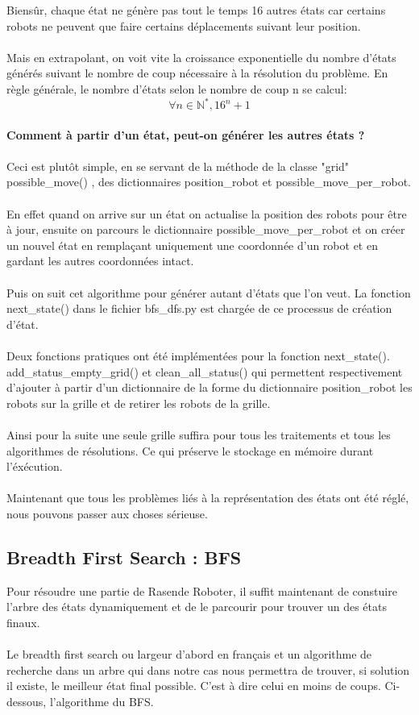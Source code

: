 \documentclass{article}
\begin{document}
Biensûr, chaque état ne génère pas tout le temps 16 autres états car certains robots ne peuvent que faire certains déplacements suivant leur position.\\\\
Mais en extrapolant, on voit vite la croissance exponentielle du nombre d'états générés suivant le nombre de coup nécessaire à la résolution du problème. En règle générale, le nombre d'états selon le nombre de coup n se calcul:\\ \[\forall n \in \mathbb{N^*} , 16^{n} + 1\] \\
\textbf{Comment à partir d'un état, peut-on générer les autres états ?}\\\\
Ceci est plutôt simple, en se servant de la méthode de la classe "grid" possible\_move() , des dictionnaires position\_robot et possible\_move\_per\_robot.\\\\
En effet quand on arrive sur un état on actualise la position des robots pour être à jour, ensuite on parcours le dictionnaire possible\_move\_per\_robot et on créer un nouvel état en remplaçant uniquement une coordonnée d'un robot et en gardant les autres coordonnées intact.\\\\
Puis on suit cet algorithme pour générer autant d'états que l'on veut. La fonction next\_state() dans le fichier bfs\_dfs.py est chargée de ce processus de création d'état.\\\\
Deux fonctions pratiques ont été implémentées pour la fonction next\_state(). add\_status\_empty\_grid() et clean\_all\_status() qui permettent respectivement d'ajouter à partir d'un dictionnaire de la forme du dictionnaire position\_robot les robots sur la grille et de retirer les robots de la grille.\\\\
Ainsi pour la suite une seule grille suffira pour tous les traitements et tous les algorithmes de résolutions. Ce qui préserve le stockage en mémoire durant l'éxécution.\\\\
Maintenant que tous les problèmes liés à la représentation des états ont été réglé, nous pouvons passer aux choses sérieuse.
\subsection{Breadth First Search : BFS}
Pour résoudre une partie de Rasende Roboter, il suffit maintenant de constuire l'arbre des états dynamiquement et de le parcourir pour trouver un des états finaux.\\\\
Le breadth first search ou largeur d'abord en français et un algorithme de recherche dans un arbre qui dans notre cas nous permettra de trouver, si solution il existe, le meilleur état final possible. C'est à dire celui en moins de coups. Ci-dessous, l'algorithme du BFS.
\end{document}
